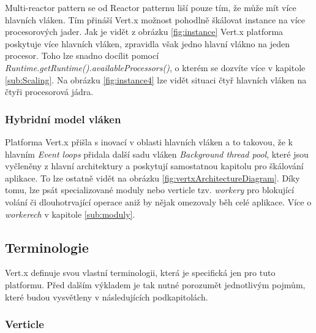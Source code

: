 Multi-reactor pattern \cite{eventLoops} se od Reactor patternu liší pouze tím, že může mít více hlavních vláken. Tím přináší Vert.x možnost pohodlně škálovat instance na více procesorových jader. Jak je vidět z obrázku \vref{fig:instance} Vert.x platforma poskytuje více hlavních vláken, zpravidla však jedno hlavní vlákno na jeden procesor. Toho lze snadno docílit pomocí \emph{Runtime.getRuntime().availableProcessors()}, o kterém se dozvíte více v kapitole \ref{sub:Scaling}. Na obrázku \vref{fig:instance4} lze vidět situaci čtyř hlavních vláken na čtyři procesorová jádra.

\subsubsection{Hybridní model vláken}\label{sub:hybrid}

Platforma Vert.x přišla s inovací v oblasti hlavních vláken a to takovou, že k hlavním \emph{Event loops} přidala další sadu vláken \emph{Background thread pool}, které jsou vyčleněny z hlavní architektury a poskytují samostatnou kapitolu pro škálování aplikace. To lze ostatně vidět na obrázku \vref{fig:vertxArchitectureDiagram}. Díky tomu, lze psát specializované moduly nebo verticle tzv. \emph{workery} pro blokující volání či dlouhotrvající operace aniž by nějak omezovaly běh celé aplikace. Více o \emph{workerech} v kapitole \ref{sub:moduly}.

\subsection{Terminologie}

Vert.x definuje svou vlastní terminologii, která je specifická jen pro tuto platformu. Před dalším výkladem je tak nutné porozumět jednotlivým pojmům, které budou vysvětleny v následujících podkapitolách.

\subsubsection{Verticle}\label{sub:verticle}

